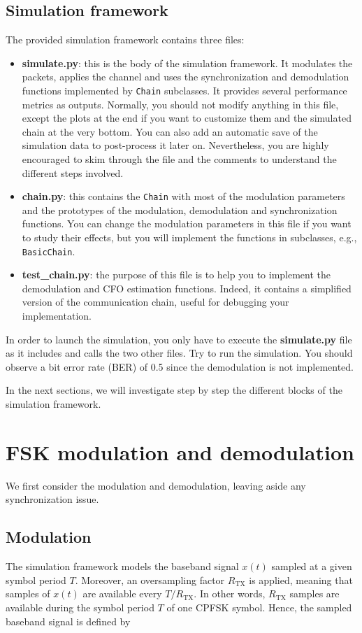 \subsection{Simulation framework}
The provided simulation framework contains three files:
\begin{itemize}
    \item \textbf{simulate.py}: this is the body of the simulation framework. It modulates the packets, applies the channel and uses the synchronization and demodulation functions implemented by \texttt{Chain} subclasses. It provides several performance metrics as outputs. Normally, you should not modify anything in this file, except the plots at the end if you want to customize them and the simulated chain at the very bottom. You can also add an automatic save of the simulation data to post-process it later on. Nevertheless, you are highly encouraged to skim through the file and the comments to understand the different steps involved.
    \item \textbf{chain.py}: this contains the \texttt{Chain} with most of the modulation parameters and the prototypes of the modulation, demodulation and synchronization functions. You can change the modulation parameters in this file if you want to study their effects, but you will implement the functions in subclasses, e.g., \texttt{BasicChain}.
    \item \textbf{test\_chain.py}: the purpose of this file is to help you to implement the demodulation and CFO estimation functions. Indeed, it contains a simplified version of the communication chain, useful for debugging your implementation.
\end{itemize}

In order to launch the simulation, you only have to execute the \textbf{simulate.py} file as it includes and calls the two other files. Try to run the simulation. You should observe a bit error rate (BER) of 0.5 since the demodulation is not implemented.

In the next sections, we will investigate step by step the different blocks of the simulation framework.

\section{FSK modulation and demodulation}
We first consider the modulation and demodulation, leaving aside any synchronization issue.

\subsection{Modulation}
The simulation framework models the baseband signal $x(t)$ sampled at a given symbol period $T$. Moreover, an oversampling factor $R_{\text{TX}}$ is applied, meaning that samples of $x(t) $ are available every $T/R_{\text{TX}}$. In other words, $R_{\text{TX}}$ samples are available during the symbol period $T$ of one CPFSK symbol. Hence, the sampled baseband signal is defined by

